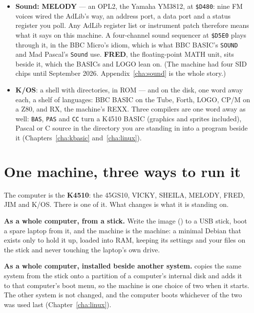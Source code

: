 \begin{itemize}[leftmargin=1.4em]
  wide, drawn with the panel's pixels (below), 90 by 33 or 67. K/OS keeps
  to 132 columns and 25 rows at least. How large a picture is too large depends on
  the computer: \verb|!k4510-vidcap| times this one and writes its
  \emph{pixel cap} into , so a slow laptop offers fewer and
  smaller resolutions rather than a machine that cannot keep up.
\item \textbf{Sound: MELODY} --- an OPL2, the Yamaha YM3812, at
  \texttt{\$D480}: nine FM voices wired the AdLib's way, an address port,
  a data port and a status register you poll. Any AdLib register list or
  instrument patch therefore means what it says on this machine. A
  four-channel sound sequencer at \texttt{\$D5E0} plays through it, in the
  BBC Micro's idiom, which is what BBC BASIC's \verb|SOUND| and Mad
  Pascal's \verb|Sound| use. \textbf{FRED}, the floating-point MATH unit, sits beside it,
  which the BASICs and LOGO lean on. (The machine had four SID chips
  until September 2026. Appendix~\ref{cha:sound} is the whole story.)
\item \textbf{K/OS}: a shell with directories, in ROM --- and on the disk,
  one word away each, a shelf of languages: BBC BASIC on
  the Tube, Forth, LOGO, CP/M on a Z80, and RX, the machine's REXX. Three compilers are one word away
  as well: \verb|BAS|, \verb|PAS| and \verb|CC| turn a K4510 BASIC
  (graphics and sprites included), Pascal or C source in the
  directory you are standing in into a program beside it
  (Chapters~\ref{cha:kbasic} and~\ref{cha:linux}).
\end{itemize}

\section{One machine, three ways to run it}\label{sec:names}
The computer is the \textbf{K4510}: the 45GS10, VICKY, SHEILA, MELODY,
FRED, JIM and K/OS. There is one of it. What changes is what it is standing on.

\textbf{As a whole computer, from a stick.} Write the image
() to a USB stick, boot a spare laptop from it,
and the machine is the machine: a minimal Debian that exists only to
hold it up, loaded into RAM, keeping its settings and your files on the
stick and never touching the laptop's own drive.

\textbf{As a whole computer, installed beside another system.}
 copies the same system from the stick onto a
partition of a computer's internal disk and adds it to that computer's
boot menu, so the machine is one choice of two when it starts. The other
system is not changed, and the computer boots whichever of the two was
used last (Chapter~\ref{cha:linux}).

